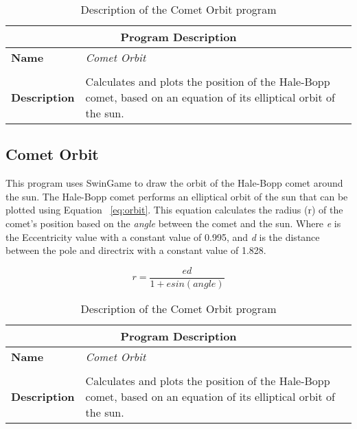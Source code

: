 \begin{table}[h]
\centering
\begin{tabular}{l|p{10cm}}
  \hline
  \multicolumn{2}{c}{\textbf{Program Description}} \\
  \hline
  \textbf{Name} & \emph{Comet Orbit} \\
  \\
  \textbf{Description} & Calculates and plots the position of the Hale-Bopp comet, based on an equation of its elliptical orbit of the sun. \\
  \hline
\end{tabular}
\caption{Description of the Comet Orbit program}
\label{tbl:data-comet-orbit}
\end{table}

\begin{figure}[p]
\end{figure}

\begin{figure}[p]
\end{figure}



\clearpage
\subsection{Comet Orbit} %
\label{sub:comet_orbit}

This program uses SwinGame to draw the orbit of the Hale-Bopp comet around the sun. The Hale-Bopp comet performs an elliptical orbit of the sun that can be plotted using Equation~ \ref{eq:orbit}. This equation calculates the radius (r) of the comet's position based on the \emph{angle} between the comet and the sun. Where \emph{e} is the Eccentricity value with a constant value of 0.995, and \emph{d} is the distance between the pole and directrix with a constant value of 1.828.

\begin{equation}
  r = \frac{ed}{1 + e sin(angle)}
  \label{eq:orbit}
\end{equation}

\begin{table}[h]
\centering
\begin{tabular}{l|p{10cm}}
  \hline
  \multicolumn{2}{c}{\textbf{Program Description}} \\
  \hline
  \textbf{Name} & \emph{Comet Orbit} \\
  \\
  \textbf{Description} & Calculates and plots the position of the Hale-Bopp comet, based on an equation of its elliptical orbit of the sun. \\
  \hline
\end{tabular}
\caption{Description of the Comet Orbit program}
\label{tbl:data-comet-orbit}
\end{table}

